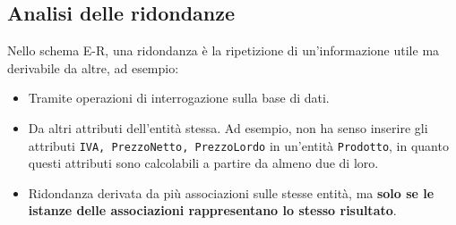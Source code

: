 \documentclass[12pt]{report}
\begin{document}
	\subsection{Analisi delle ridondanze}
	Nello schema E-R, una ridondanza è la ripetizione di un'informazione utile ma derivabile da altre, ad esempio:
	\begin{itemize}
		\item Tramite operazioni di interrogazione sulla base di dati.
		
		\item Da altri attributi dell'entità stessa. Ad esempio, non ha senso inserire gli attributi \texttt{IVA, PrezzoNetto, PrezzoLordo} in un'entità \texttt{Prodotto}, in quanto questi attributi sono calcolabili a partire da almeno due di loro.
		
		\item Ridondanza derivata da più associazioni sulle stesse entità, ma \textbf{solo se le istanze delle associazioni rappresentano lo stesso risultato}.
	\end{itemize}
	
\end{document}

